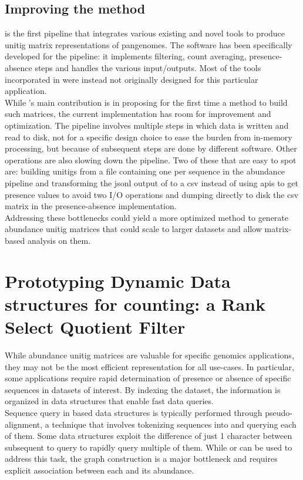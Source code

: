 \subsection{Improving the method}
\muset is the first pipeline that integrates various existing and novel tools to produce unitig matrix representations of pangenomes. The \kmat software has been specifically developed for the pipeline: it implements filtering, count averaging, presence-absence steps and handles the various input/outputs. Most of the tools incorporated in \muset were instead not originally designed for this particular application.\\
While \muset's main contribution is in proposing for the first time a method to build such matrices, the current implementation has room for improvement and optimization.
The pipeline involves multiple steps in which data is written and read to disk, not for a specific design choice to ease the burden from in-memory processing, but because of subsequent steps are done by different software. Other operations are also slowing down the pipeline. Two of these that are easy to spot are: building unitigs from a file containing one \kmer per sequence in the abundance pipeline and transforming the jsonl output of \ggcat to a csv instead of using \ggcat apis to get presence values to avoid two I/O operations and dumping directly to disk the csv matrix in the presence-absence implementation.\\
Addressing these bottlenecks could yield a more optimized method to generate abundance unitig matrices that could scale to larger datasets and allow matrix-based analysis on them.

\section{Prototyping Dynamic Data structures for \kmer counting: a Rank Select Quotient Filter}
\label{sec:qf}
While abundance unitig matrices are valuable for specific genomics applications, they may not be the most efficient representation for all use-cases. In particular, some applications require rapid determination of presence or absence of specific sequences in datasets of interest. By indexing the dataset, the information is organized in data structures that enable fast data queries.\\
Sequence query in \kmer based data structures is typically performed through pseudo-alignment, a technique that involves tokenizing sequences into \kmers and querying each of them. Some data structures exploit the difference of just 1 character between subsequent \kmers to query to rapidly query multiple of them. While \cdbg or \ccdbg can be used to address this task, the graph construction is a major bottleneck and requires explicit association between each \kmer and its abundance. \\
